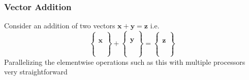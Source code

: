 \documentclass[sigplan,screen]{acmart}
\begin{document}
\subsubsection{Vector Addition}
Consider an addition of two vectors $\mathbf{x} + \mathbf{y} = \mathbf{z}$ i.e.
\begin{equation*}
\begin{Bmatrix}
\\
\\
\mathbf{x}\\
\\
\\
\\	
\end{Bmatrix} +
\begin{Bmatrix}
\\
\\
\mathbf{y}\\
\\
\\
\\	
\end{Bmatrix}
= \begin{Bmatrix}
\\
\\
\mathbf{z}\\
\\
\\
\\	
\end{Bmatrix}
\end{equation*}
Parallelizing the elementwise operations such as this with multiple processors very straightforward
\end{document}
